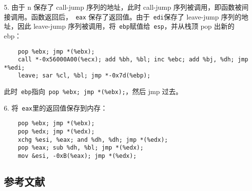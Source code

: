 \documentclass{article}
\begin{document}
5. 由于 n 保存了 call-jump 序列的地址，此时 call-jump 序列被调用，即函数被间接调用。函数返回后，\verb+ eax+ 保存了返回值。由于\verb+ edi+保存了 leave-jump 序列的地址，因此 leave-jump 序列被调用，将\verb+ ebp+赋值给\verb+ esp+，并从栈顶 pop 出新的 ebp：
\begin{verbatim}
    pop %ebx; jmp *(%ebx);
    call *-0x56000A00(%ecx); add %bh, %bl; inc %ebc; add %bj, %dh; jmp *%edi;
    leave; sar %cl, %bl; jmp *-0x7d(%ebp);
\end{verbatim}

此时\verb+ ebp+指向\verb+ pop %ebx; jmp *(%ebx);+，然后 jmp 过去。

6. 将\verb+ eax+里的返回值保存到内存：
\begin{verbatim}
    pop %ebx; jmp *(%ebx);
    pop %edx; jmp *(%edx);
    xchg %esi, %eax; and %dh, %dh; jmp *(%edx);
    pop %eax; sub %dh, %bl; jmp *(%edx);
    mov &esi, -0xB(%eax); jmp *(%edx);
\end{verbatim}

\newpage
\begin{center}
    \section{参考文献}
\end{center}


\end{document}
